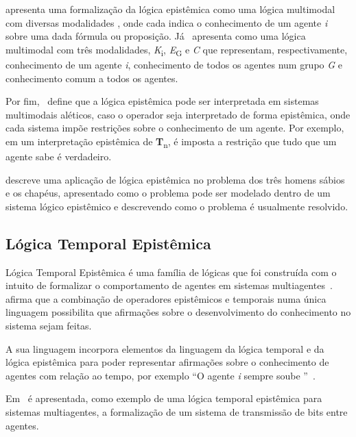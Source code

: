              apresenta uma formalização da lógica epistêmica como uma lógica multimodal com diversas modalidades \BOX, onde cada  indica
            o conhecimento de um agente \textit{i} sobre uma dada fórmula ou proposição. Já~ apresenta como uma lógica multimodal com
            três modalidades, \textit{K}\textsubscript{i}, \textit{E}\textsubscript{G} e \textit{C} que representam, respectivamente, conhecimento de um agente \textit{i},
            conhecimento de todos os agentes num grupo \textit{G} e conhecimento comum a todos os agentes.

            Por fim,~ define que a lógica epistêmica pode ser interpretada em sistemas multimodais aléticos, caso o operador \BOX
            seja interpretado de forma epistêmica, onde cada sistema impõe restrições sobre o conhecimento de um agente. Por exemplo, em um interpretação epistêmica de
            \textbf{T}\textsubscript{n}, é imposta a restrição que tudo que um agente sabe é verdadeiro.

             descreve uma aplicação de lógica epistêmica no problema dos três homens sábios e os chapéus, apresentado como o problema pode ser modelado
            dentro de um sistema lógico epistêmico e descrevendo como o problema é usualmente resolvido.

        \subsection{Lógica Temporal Epistêmica}
            \label{subsec:LogicaTemporalEpistemica}
            Lógica Temporal Epistêmica é uma família de lógicas que foi construída com o intuito de formalizar o comportamento de agentes em sistemas
            multiagentes~\cite{gabbay2003many}.~ afirma que a combinação de operadores epistêmicos e temporais numa única linguagem
            possibilita que afirmações sobre o desenvolvimento do conhecimento no sistema sejam feitas.

            A sua linguagem incorpora elementos da linguagem da lógica temporal e da lógica epistêmica para poder
            representar afirmações sobre o conhecimento de agentes com relação ao tempo, por exemplo ``O agente \textit{i} sempre soube \PHI''~\cite{fagin2004reasoning}.

            Em~ é apresentada, como exemplo de uma lógica temporal epistêmica para sistemas multiagentes, a formalização de um sistema
            de transmissão de bits entre agentes.

